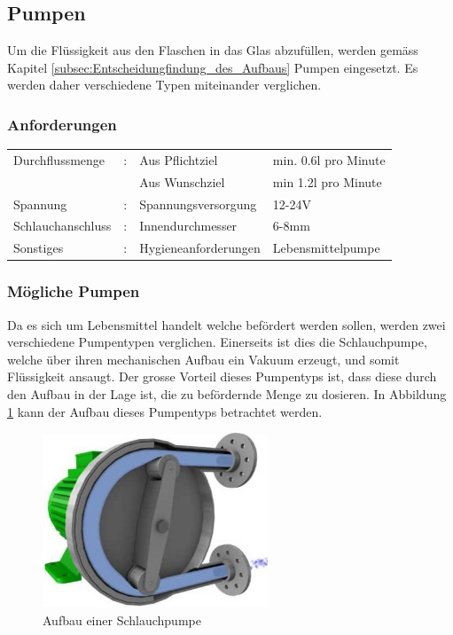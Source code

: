 \subsection{Pumpen}
\label{subsubsec:Pumpen}

Um die Flüssigkeit aus den Flaschen in das Glas abzufüllen, werden gemäss Kapitel \ref{subsec:Entscheidungfindung_des_Aufbaus} Pumpen eingesetzt. Es werden daher verschiedene Typen miteinander verglichen.

\subsubsection{Anforderungen}\label{par:Anforderungen_Pumpen}

\begin{tabularx}{\textwidth}{lllX}
Durchflussmenge & : & Aus Pflichtziel & min. 0.6l pro Minute\\
 & & Aus Wunschziel & min 1.2l pro Minute \\
Spannung & : & Spannungsversorgung & 12-24V \\
Schlauchanschluss & : & Innendurchmesser & 6-8mm \\
Sonstiges & : & Hygieneanforderungen & Lebensmittelpumpe \\
\end{tabularx}

\subsubsection{Mögliche Pumpen}\label{par:Mögliche_Pumpen}

Da es sich um Lebensmittel handelt welche befördert werden sollen, werden zwei verschiedene Pumpentypen verglichen. Einerseits ist dies die Schlauchpumpe, welche über ihren mechanischen Aufbau ein Vakuum erzeugt, und somit Flüssigkeit ansaugt. Der grosse Vorteil dieses Pumpentyps ist, dass diese durch den Aufbau in der Lage ist, die zu befördernde Menge zu dosieren. In Abbildung \ref{fig:Schlauchpumpe} kann der Aufbau dieses Pumpentyps betrachtet werden. \cite{acky69_schlauchpumpe_2018}

\begin{figure}[h!]
	\centering
	\includegraphics[width=0.6\textwidth]{graphics/Schlauchpumpe.jpg}
	\caption{Aufbau einer Schlauchpumpe \cite{creative_commons_techniker_2019}}
	\label{fig:Schlauchpumpe}
\end{figure}   

